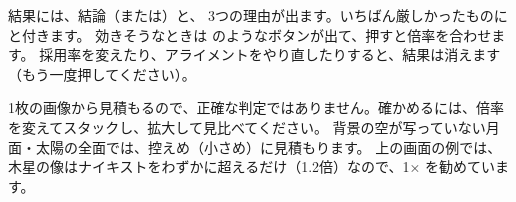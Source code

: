 結果には、結論（または）と、
3つの理由が出ます。いちばん厳しかったものにと付きます。
効きそうなときは  のようなボタンが出て、押すと倍率を合わせます。
採用率を変えたり、アライメントをやり直したりすると、結果は消えます（もう一度押してください）。

\begin{caution}
  1枚の画像から見積もるので、正確な判定ではありません。確かめるには、倍率を変えてスタックし、拡大して見比べてください。
  背景の空が写っていない月面・太陽の全面では、控えめ（小さめ）に見積もります。
  上の画面の例では、木星の像はナイキストをわずかに超えるだけ（1.2倍）なので、1× を勧めています。
\end{caution}
